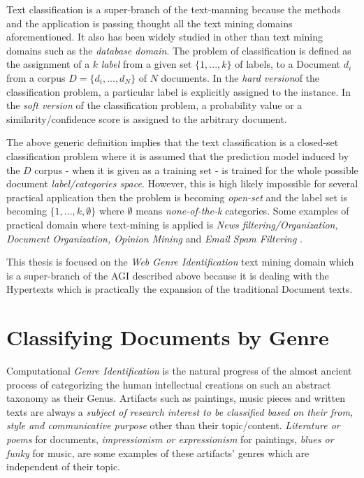Text classification is a super-branch of the text-manning because the methods and the application is passing thought all the text mining domains aforementioned. It also has been widely studied in other than text mining domains such as the \textit{database domain}.  The problem of classification is defined as the assignment of a  $k$ \textit{label} from a given set $\{1, ..., k\}$ of labels, to a Document $d_{i}$ from a corpus $D = \{d_{i},...,d_{N} \}$ of $N$ documents. In the \textit{hard version}of the classification problem, a particular label is explicitly assigned to the instance. In the \textit{soft version} of the classification problem, a probability value or a similarity/confidence score is assigned to the arbitrary document.

The above generic definition implies that the text classification is a closed-set classification problem where it is assumed that the prediction model induced by the $D$ corpus - when it is given as a training set - is trained for the whole possible document \textit{label/categories space}. However, this is high likely impossible for several practical application then the problem is becoming \textit{open-set} and the label set is becoming  $\{1, ..., k, \emptyset \}$ where $\emptyset$ means \textit{none-of-the-k} categories. Some examples of practical domain where text-mining is applied is \textit{News filtering/Organization, Document Organization, Opinion Mining} and \textit{Email Spam Filtering} \cite{Aggarwal2012ASO}.

This thesis is focused on the \textit{Web Genre Identification} text mining domain which is a super-branch of the AGI described above because it is dealing with the Hypertexts which is practically the expansion of the traditional Document texts.

\section{Classifying Documents by Genre} \label{chap:introduction:sec:classifying_by_genre}

Computational \textit{Genre Identification} is the natural progress of the almost ancient process of categorizing the human intellectual creations on such an abstract taxonomy as their Genus. Artifacts such as paintings, music pieces and written texts are always a \textit{subject of research interest to be classified based on their from, style and communicative purpose} other than their topic/content. \textit{Literature or poems} for documents, \textit{impressionism or expressionism} for paintings, \textit{blues or funky} for music, are some examples of these artifacts' genres which are independent of their topic.

